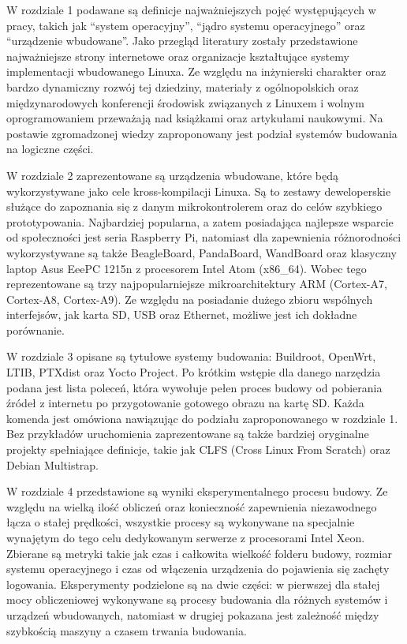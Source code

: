 \documentclass[printmode]{mgr}
\begin{document}
W rozdziale 1 podawane są definicje najważniejszych pojęć występujących w pracy, takich jak ``system operacyjny'', ``jądro systemu operacyjnego'' oraz ``urządzenie wbudowane''.
Jako przegląd literatury zostały przedstawione najważniejsze strony internetowe oraz organizacje kształtujące systemy implementacji wbudowanego Linuxa.
Ze względu na inżynierski charakter oraz bardzo dynamiczny rozwój tej dziedziny, materiały z ogólnopolskich oraz międzynarodowych konferencji środowisk związanych z Linuxem i wolnym oprogramowaniem przeważają nad książkami oraz artykułami naukowymi.
Na postawie zgromadzonej wiedzy zaproponowany jest podział systemów budowania na logiczne części.

W rozdziale 2 zaprezentowane są urządzenia wbudowane, które będą wykorzystywane jako cele kross-kompilacji Linuxa.
Są to zestawy deweloperskie służące do zapoznania się z danym mikrokontrolerem oraz do celów szybkiego prototypowania.
Najbardziej popularna, a zatem posiadająca najlepsze wsparcie od społeczności jest seria Raspberry Pi, natomiast dla zapewnienia różnorodności wykorzystywane są także BeagleBoard, PandaBoard, WandBoard oraz klasyczny laptop Asus EeePC 1215n z procesorem Intel Atom (x86\_64).
Wobec tego reprezentowane są trzy najpopularniejsze mikroarchitektury ARM (Cortex-A7, Cortex-A8, Cortex-A9).
Ze względu na posiadanie dużego zbioru wspólnych interfejsów, jak karta SD, USB oraz Ethernet, możliwe jest ich dokładne porównanie.

W rozdziale 3 opisane są tytułowe systemy budowania: Buildroot, OpenWrt, LTIB, PTXdist oraz Yocto Project.
Po krótkim wstępie dla danego narzędzia podana jest lista poleceń, która wywołuje pełen proces budowy od pobierania źródeł z internetu po przygotowanie gotowego obrazu na kartę SD.
Każda komenda jest omówiona nawiązując do podziału zaproponowanego w rozdziale 1.
Bez przykładów uruchomienia zaprezentowane są także bardziej oryginalne projekty spełniające definicje, takie jak CLFS (Cross Linux From Scratch) oraz Debian Multistrap.

W rozdziale 4 przedstawione są wyniki eksperymentalnego procesu budowy.
Ze względu na wielką ilość obliczeń oraz konieczność zapewnienia niezawodnego łącza o stałej prędkości, wszystkie procesy są wykonywane na specjalnie wynajętym do tego celu dedykowanym serwerze z procesorami Intel Xeon.
Zbierane są metryki takie jak czas i całkowita wielkość folderu budowy, rozmiar systemu operacyjnego i czas od włączenia urządzenia do pojawienia się zachęty logowania.
Eksperymenty podzielone są na dwie części: w pierwszej dla stałej mocy obliczeniowej wykonywane są procesy budowania dla różnych systemów i urządzeń wbudowanych, natomiast w drugiej pokazana jest zależność między szybkością maszyny a czasem trwania budowania.
\end{document}
